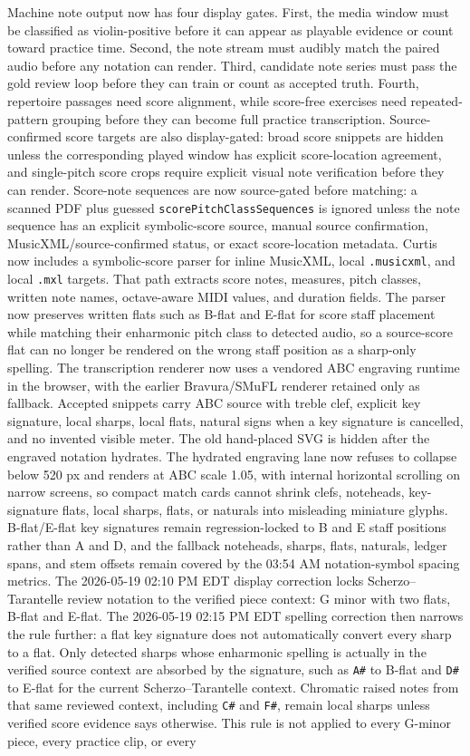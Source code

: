 \documentclass[12pt,letterpaper]{article}
\begin{document}
Machine note output now has four display gates. First, the media window must be classified as violin-positive before it can appear as playable evidence or count toward practice time. Second, the note stream must audibly match the paired audio before any notation can render. Third, candidate note series must pass the gold review loop before they can train or count as accepted truth. Fourth, repertoire passages need score alignment, while score-free exercises need repeated-pattern grouping before they can become full practice transcription. Source-confirmed score targets are also display-gated: broad score snippets are hidden unless the corresponding played window has explicit score-location agreement, and single-pitch score crops require explicit visual note verification before they can render. Score-note sequences are now source-gated before matching: a scanned PDF plus guessed \texttt{scorePitchClassSequences} is ignored unless the note sequence has an explicit symbolic-score source, manual source confirmation, MusicXML/source-confirmed status, or exact score-location metadata. Curtis now includes a symbolic-score parser for inline MusicXML, local \texttt{.musicxml}, and local \texttt{.mxl} targets. That path extracts score notes, measures, pitch classes, written note names, octave-aware MIDI values, and duration fields. The parser now preserves written flats such as B-flat and E-flat for score staff placement while matching their enharmonic pitch class to detected audio, so a source-score flat can no longer be rendered on the wrong staff position as a sharp-only spelling. The transcription renderer now uses a vendored ABC engraving runtime in the browser, with the earlier Bravura/SMuFL renderer retained only as fallback. Accepted snippets carry ABC source with treble clef, explicit key signature, local sharps, local flats, natural signs when a key signature is cancelled, and no invented visible meter. The old hand-placed SVG is hidden after the engraved notation hydrates. The hydrated engraving lane now refuses to collapse below 520 px and renders at ABC scale 1.05, with internal horizontal scrolling on narrow screens, so compact match cards cannot shrink clefs, noteheads, key-signature flats, local sharps, flats, or naturals into misleading miniature glyphs. B-flat/E-flat key signatures remain regression-locked to B and E staff positions rather than A and D, and the fallback noteheads, sharps, flats, naturals, ledger spans, and stem offsets remain covered by the 03:54 AM notation-symbol spacing metrics. The 2026-05-19 02:10 PM EDT display correction locks Scherzo--Tarantelle review notation to the verified piece context: G minor with two flats, B-flat and E-flat. The 2026-05-19 02:15 PM EDT spelling correction then narrows the rule further: a flat key signature does not automatically convert every sharp to a flat. Only detected sharps whose enharmonic spelling is actually in the verified source context are absorbed by the signature, such as \texttt{A\#} to B-flat and \texttt{D\#} to E-flat for the current Scherzo--Tarantelle context. Chromatic raised notes from that same reviewed context, including \texttt{C\#} and \texttt{F\#}, remain local sharps unless verified score evidence says otherwise. This rule is not applied to every G-minor piece, every practice clip, or every 
\end{document}
